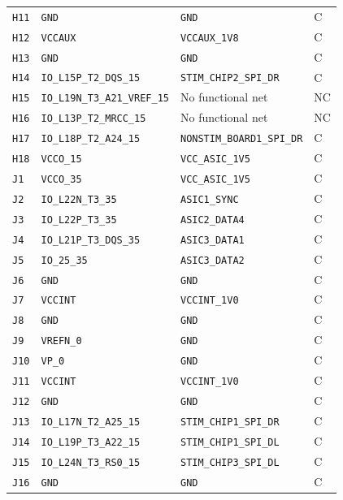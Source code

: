 \documentclass[10pt,a4paper]{article}
\begin{document}
\begin{longtable}{@{}P{15mm}P{42mm}P{92mm}P{10mm}@{}}
\nolinkurl{H11} & \nolinkurl{GND} & \nolinkurl{GND} & C \\
\nolinkurl{H12} & \nolinkurl{VCCAUX} & \nolinkurl{VCCAUX_1V8} & C \\
\nolinkurl{H13} & \nolinkurl{GND} & \nolinkurl{GND} & C \\
\nolinkurl{H14} & \nolinkurl{IO_L15P_T2_DQS_15} & \nolinkurl{STIM_CHIP2_SPI_DR} & C \\
\nolinkurl{H15} & \nolinkurl{IO_L19N_T3_A21_VREF_15} & No functional net & NC \\
\nolinkurl{H16} & \nolinkurl{IO_L13P_T2_MRCC_15} & No functional net & NC \\
\nolinkurl{H17} & \nolinkurl{IO_L18P_T2_A24_15} & \nolinkurl{NONSTIM_BOARD1_SPI_DR} & C \\
\nolinkurl{H18} & \nolinkurl{VCCO_15} & \nolinkurl{VCC_ASIC_1V5} & C \\
\nolinkurl{J1} & \nolinkurl{VCCO_35} & \nolinkurl{VCC_ASIC_1V5} & C \\
\nolinkurl{J2} & \nolinkurl{IO_L22N_T3_35} & \nolinkurl{ASIC1_SYNC} & C \\
\nolinkurl{J3} & \nolinkurl{IO_L22P_T3_35} & \nolinkurl{ASIC2_DATA4} & C \\
\nolinkurl{J4} & \nolinkurl{IO_L21P_T3_DQS_35} & \nolinkurl{ASIC3_DATA1} & C \\
\nolinkurl{J5} & \nolinkurl{IO_25_35} & \nolinkurl{ASIC3_DATA2} & C \\
\nolinkurl{J6} & \nolinkurl{GND} & \nolinkurl{GND} & C \\
\nolinkurl{J7} & \nolinkurl{VCCINT} & \nolinkurl{VCCINT_1V0} & C \\
\nolinkurl{J8} & \nolinkurl{GND} & \nolinkurl{GND} & C \\
\nolinkurl{J9} & \nolinkurl{VREFN_0} & \nolinkurl{GND} & C \\
\nolinkurl{J10} & \nolinkurl{VP_0} & \nolinkurl{GND} & C \\
\nolinkurl{J11} & \nolinkurl{VCCINT} & \nolinkurl{VCCINT_1V0} & C \\
\nolinkurl{J12} & \nolinkurl{GND} & \nolinkurl{GND} & C \\
\nolinkurl{J13} & \nolinkurl{IO_L17N_T2_A25_15} & \nolinkurl{STIM_CHIP1_SPI_DR} & C \\
\nolinkurl{J14} & \nolinkurl{IO_L19P_T3_A22_15} & \nolinkurl{STIM_CHIP1_SPI_DL} & C \\
\nolinkurl{J15} & \nolinkurl{IO_L24N_T3_RS0_15} & \nolinkurl{STIM_CHIP3_SPI_DL} & C \\
\nolinkurl{J16} & \nolinkurl{GND} & \nolinkurl{GND} & C \\

\end{longtable}
\end{document}
